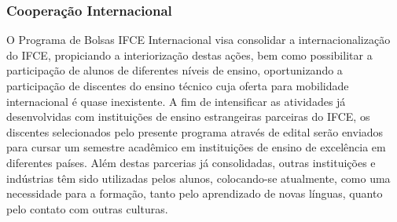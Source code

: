 


\subsubsection{Cooperação Internacional}

O Programa de Bolsas IFCE Internacional visa consolidar a internacionalização do IFCE, propiciando a interiorização destas ações, bem como possibilitar a participação de alunos de diferentes níveis de ensino, oportunizando a participação de discentes do ensino técnico cuja oferta para mobilidade internacional é quase inexistente.
A fim de intensificar as atividades já desenvolvidas com instituições de ensino estrangeiras parceiras do IFCE, os discentes selecionados pelo presente programa através de edital serão enviados para cursar um semestre acadêmico em instituições de ensino de excelência em diferentes países.
Além destas parcerias já consolidadas, outras instituições e indústrias têm sido utilizadas pelos alunos, colocando-se atualmente, como uma necessidade para a formação, tanto pelo aprendizado de novas línguas, quanto pelo contato com outras culturas.


